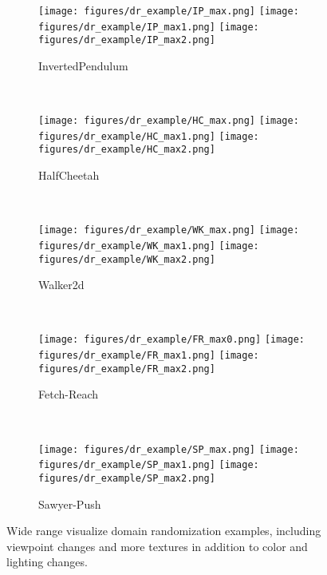 \begin{figure}[t]
    \centering
    \begin{subfigure}[t]{\linewidth}
        \centering
        \texttt{[image: figures/dr\_example/IP\_max.png]}
        \texttt{[image: figures/dr\_example/IP\_max1.png]}
        \texttt{[image: figures/dr\_example/IP\_max2.png]}
        \caption{InvertedPendulum}
    \end{subfigure}
    \\
    \begin{subfigure}[t]{\linewidth}
        \centering
        \texttt{[image: figures/dr\_example/HC\_max.png]}
        \texttt{[image: figures/dr\_example/HC\_max1.png]}
        \texttt{[image: figures/dr\_example/HC\_max2.png]}
        \caption{HalfCheetah}
    \end{subfigure}
    \\
    \begin{subfigure}[t]{\linewidth}
        \centering
        \texttt{[image: figures/dr\_example/WK\_max.png]}
        \texttt{[image: figures/dr\_example/WK\_max1.png]}
        \texttt{[image: figures/dr\_example/WK\_max2.png]}
        \caption{Walker2d}
    \end{subfigure}
    \\
    \begin{subfigure}[t]{\linewidth}
        \centering
        \texttt{[image: figures/dr\_example/FR\_max0.png]}
        \texttt{[image: figures/dr\_example/FR\_max1.png]}
        \texttt{[image: figures/dr\_example/FR\_max2.png]}
        \caption{Fetch-Reach}
    \end{subfigure}
    \\
    \begin{subfigure}[t]{\linewidth}
        \centering
        \texttt{[image: figures/dr\_example/SP\_max.png]}
        \texttt{[image: figures/dr\_example/SP\_max1.png]}
        \texttt{[image: figures/dr\_example/SP\_max2.png]}
        \caption{Sawyer-Push}
    \end{subfigure}
    \caption{
        Wide range visualize domain randomization examples, including viewpoint changes and more textures in addition to color and lighting changes.
    }
    \label{fig:dr_visual_wide}
\end{figure}